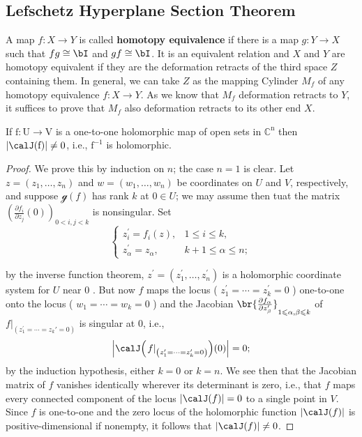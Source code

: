 \documentclass[lang=en,12pt]{beautybook}
\begin{document}
\subsection{Lefschetz Hyperplane Section Theorem}

A map $f: X\to Y$ is called \textbf{homotopy equivalence} if  there is a map $g: Y\to X$ such that $fg\cong \bI$ and $gf\cong \bI$. It is an equivalent relation and $X$ and $Y$ are homotopy equivalent if they are the deformation retracts of the third space $Z$ containing them. In general, we can take $Z$ as the mapping Cylinder $M_f$ of any homotopy equivalence $f: X\to Y$. As we know that $M_f$ deformation retracts to $Y$, it suffices to prove that $M_f$ also deformation retracts to its other end $X$.

\begin{proposition}[][][prop:1]
  If $\mathrm{f}: \mathrm{U} \rightarrow \mathrm{V}$ is a one-to-one holomorphic map of open sets in $\mathbb{C}^{\mathrm{n}}$ then $|\calJ (\mathrm{f})| \neq 0$, i.e., $\mathrm{f}^{-1}$ is holomorphic.
\end{proposition}


\begin{proof}
  We prove this by induction on $n$; the case $n=1$ is clear. Let $z=\left(z_1, \ldots, z_n\right)$ and $w=\left(w_1, \ldots, w_n\right)$ be coordinates on $U$ and $V$, respectively, and suppose $\mathcal{g}(f)$ has rank $k$ at $0 \in U$; we may assume then tuat the matrix $\left(\frac{\partial f_i }{\partial z_j}(0)\right)_{0<i, j<k}$ is nonsingular.  Set
  $$\left\{\!
    \begin{array}{ll}
      z_i^{\prime}=f_i(z),        & 1 \leqslant i \leqslant k,         \\
      z_\alpha^{\prime}=z_\alpha, & k+1 \leqslant \alpha \leqslant n ;
    \end{array}\right.
  $$

  by the inverse function theorem, $z^{\prime}=\left(z_1^{\prime}, \ldots, z_n^{\prime}\right)$ is a holomorphic coordinate system for $U$ near 0 . But now $f$ maps the locus ( $z_1^{\prime}=\cdots=z_k^{\prime}=0$ ) one-to-one onto the locus ( $w_1=\cdots=w_k=0$ ) and the Jacobian $\br{\frac{\partial f_\alpha} { \partial z_\beta^{\prime}}}_{1\leqslant\alpha,\beta\leqslant k}$  of $\left.f\right|_{\left(z_1^{\prime}=\cdots=z_k'=0\right)}$ is singular at $0$, i.e.,
  $$\abs{\calJ \qty(\left.f\right|_{\left(z_1^{\prime}=\cdots=z_k'=0\right)})(0)}=0;$$
  by the induction hypothesis, either $k=0$ or $k=n$. We see then that the Jacobian matrix of $f$ vanishes identically wherever its determinant is zero, i.e., that $f$ maps every connected component of the locus $|\calJ (f)|=0$ to a single point in $V$. Since $f$ is one-to-one and the zero locus of the holomorphic function $|\calJ (f)|$ is positive-dimensional if nonempty, it follows that $|\calJ (f)| \neq 0$.
\end{proof}
\end{document}
